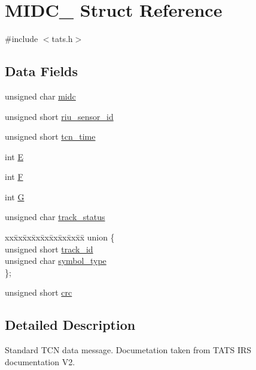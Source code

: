 \hypertarget{struct_m_i_d_c__01}{}\section{M\+I\+D\+C\+\_ Struct Reference}
\label{struct_m_i_d_c__01}


{\ttfamily \#include $<$tats.\+h$>$}

\subsection*{Data Fields}
\begin{DoxyCompactItemize}
\item 
unsigned char \mbox{\hyperlink{struct_m_i_d_c__01_a4e26ddc4da6da6fea6901c0caee2e7fd}{midc}}
\item 
unsigned short \mbox{\hyperlink{struct_m_i_d_c__01_a69763ba083a498ead8e43afecc94b4d7}{riu\+\_\+sensor\+\_\+id}}
\item 
unsigned short \mbox{\hyperlink{struct_m_i_d_c__01_a445d2a2e3e4ac1f29a426d3a1a617bfc}{tcn\+\_\+time}}
\item 
int \mbox{\hyperlink{struct_m_i_d_c__01_a105a63272424d04208f33bac739acf98}{E}}
\item 
int \mbox{\hyperlink{struct_m_i_d_c__01_a83e4d55f5823e12da6439ef69be4a42a}{F}}
\item 
int \mbox{\hyperlink{struct_m_i_d_c__01_ab8735735273b982cc3125e51fe46e2f4}{G}}
\item 
unsigned char \mbox{\hyperlink{struct_m_i_d_c__01_aa0ab1eef0f6c81401665b11a7e91c9d5}{track\+\_\+status}}
\item 
\begin{tabbing}
xx\=xx\=xx\=xx\=xx\=xx\=xx\=xx\=xx\=\kill
union \{\\
\>unsigned short \mbox{\hyperlink{struct_m_i_d_c__01_ab9a4981dc4f20d168da9ffb2db377584}{track\_id}}\\
\>unsigned char \mbox{\hyperlink{struct_m_i_d_c__01_a10ae4966d28a3e8356b329080e73e037}{symbol\_type}}\\
\}; \\

\end{tabbing}\item 
unsigned short \mbox{\hyperlink{struct_m_i_d_c__01_a0e34886f35a1dc651e0caf46a73e27ab}{crc}}
\end{DoxyCompactItemize}


\subsection{Detailed Description}
Standard T\+CN data message. Documetation taken from T\+A\+TS I\+RS documentation V2. 

